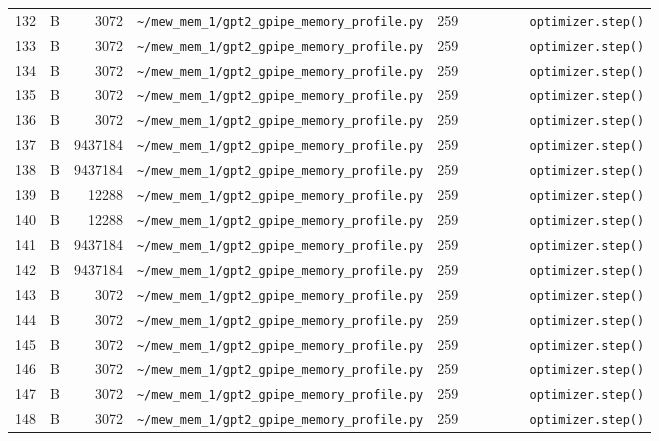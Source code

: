 \documentclass{article}
\begin{document}
\begin{longtable}{r l r p{6.5cm} r p{7.0cm}}
132 & B & 3072 & \lstinline|~/mew_mem_1/gpt2_gpipe_memory_profile.py| & 259 & \lstinline|        optimizer.step()| \\
133 & B & 3072 & \lstinline|~/mew_mem_1/gpt2_gpipe_memory_profile.py| & 259 & \lstinline|        optimizer.step()| \\
134 & B & 3072 & \lstinline|~/mew_mem_1/gpt2_gpipe_memory_profile.py| & 259 & \lstinline|        optimizer.step()| \\
135 & B & 3072 & \lstinline|~/mew_mem_1/gpt2_gpipe_memory_profile.py| & 259 & \lstinline|        optimizer.step()| \\
136 & B & 3072 & \lstinline|~/mew_mem_1/gpt2_gpipe_memory_profile.py| & 259 & \lstinline|        optimizer.step()| \\
137 & B & 9437184 & \lstinline|~/mew_mem_1/gpt2_gpipe_memory_profile.py| & 259 & \lstinline|        optimizer.step()| \\
138 & B & 9437184 & \lstinline|~/mew_mem_1/gpt2_gpipe_memory_profile.py| & 259 & \lstinline|        optimizer.step()| \\
139 & B & 12288 & \lstinline|~/mew_mem_1/gpt2_gpipe_memory_profile.py| & 259 & \lstinline|        optimizer.step()| \\
140 & B & 12288 & \lstinline|~/mew_mem_1/gpt2_gpipe_memory_profile.py| & 259 & \lstinline|        optimizer.step()| \\
141 & B & 9437184 & \lstinline|~/mew_mem_1/gpt2_gpipe_memory_profile.py| & 259 & \lstinline|        optimizer.step()| \\
142 & B & 9437184 & \lstinline|~/mew_mem_1/gpt2_gpipe_memory_profile.py| & 259 & \lstinline|        optimizer.step()| \\
143 & B & 3072 & \lstinline|~/mew_mem_1/gpt2_gpipe_memory_profile.py| & 259 & \lstinline|        optimizer.step()| \\
144 & B & 3072 & \lstinline|~/mew_mem_1/gpt2_gpipe_memory_profile.py| & 259 & \lstinline|        optimizer.step()| \\
145 & B & 3072 & \lstinline|~/mew_mem_1/gpt2_gpipe_memory_profile.py| & 259 & \lstinline|        optimizer.step()| \\
146 & B & 3072 & \lstinline|~/mew_mem_1/gpt2_gpipe_memory_profile.py| & 259 & \lstinline|        optimizer.step()| \\
147 & B & 3072 & \lstinline|~/mew_mem_1/gpt2_gpipe_memory_profile.py| & 259 & \lstinline|        optimizer.step()| \\
148 & B & 3072 & \lstinline|~/mew_mem_1/gpt2_gpipe_memory_profile.py| & 259 & \lstinline|        optimizer.step()| \\

\end{longtable}
\end{document}
